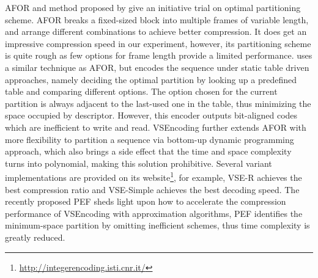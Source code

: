 \documentclass[runningheads]{comsis2}
\begin{document}
AFOR and method proposed by \cite{anh2004index} give an initiative trial on optimal partitioning scheme.
AFOR breaks a fixed-sized block into multiple frames of variable length, and arrange different combinations to achieve better compression.
It does get an impressive compression speed in our experiment, however, its partitioning scheme is quite rough as few options for frame length provide a limited performance.
\cite{anh2004index} uses a similar technique as AFOR, but encodes the sequence under static table driven approaches, namely deciding the optimal partition by looking up a predefined table and comparing different options.
The option chosen for the current partition is always adjacent to the last-used one in the table, thus minimizing the space occupied by descriptor.
However, this encoder outputs bit-aligned codes which are inefficient to write and read.
VSEncoding further extends AFOR with more flexibility to partition a sequence via bottom-up dynamic programming approach, which also brings a side effect that the time and space complexity turns into polynomial, making this solution prohibitive.
Several variant implementations are provided on its website\footnote{\url{http://integerencoding.isti.cnr.it/}}, for example, VSE-R achieves the best compression ratio and VSE-Simple achieves the best decoding speed.
The recently proposed PEF sheds light upon how to accelerate the compression performance of VSEncoding with approximation algorithms, PEF identifies the minimum-space partition by omitting inefficient schemes, thus time complexity is greatly reduced.
\end{document}
